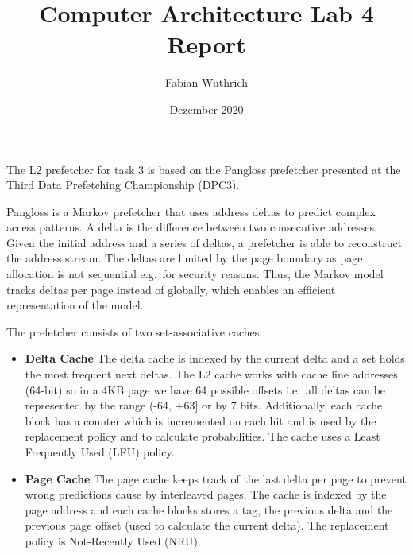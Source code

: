 \documentclass[a4paper]{article}
\begin{document}
\title{Computer Architecture Lab 4 Report}
\author{Fabian Wüthrich}
\date{Dezember 2020}
\maketitle

The L2 prefetcher for task 3 is based on the Pangloss prefetcher\cite{pangloss}
presented at the Third Data Prefetching Championship (DPC3)\cite{dpc3}.

Pangloss is a Markov prefetcher\cite{markov-prefetcher} that uses address deltas
to predict complex access patterns. A delta is the difference between two
consecutive addresses. Given the initial address and a series of deltas,
a prefetcher is able to reconstruct the address stream. The deltas are limited
by the page boundary as page allocation is not sequential e.g.\ for security
reasons.  Thus, the Markov model tracks deltas per page instead of globally,
which enables an efficient representation of the model.

The prefetcher consists of two set-associative caches:
\begin{itemize}
    \item \textbf{Delta Cache} The delta cache is indexed by the current delta
        and a set holds the most frequent next deltas. The L2 cache works with
        cache line addresses (64-bit) so in a 4KB page we have 64 possible
        offsets i.e.\ all deltas can be represented by the range (-64, +63] or by
        7 bits. Additionally, each cache block has a counter which is
        incremented on each hit and is used by the replacement policy and to
        calculate probabilities. The cache uses a Least Frequently Used
        (LFU) policy.

    \item \textbf{Page Cache} The page cache keeps track of the last delta per
        page to prevent wrong predictions cause by interleaved pages.
        The cache is indexed by the page address and each cache blocks stores
        a tag, the previous delta and the previous page offset (used to
        calculate the current delta). The replacement policy is Not-Recently
        Used (NRU).
\end{itemize}
\end{document}

